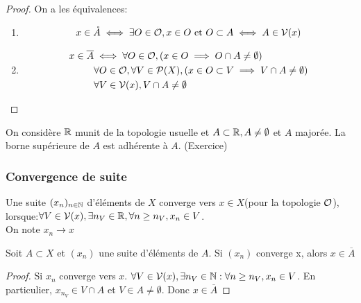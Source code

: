 \documentclass[]{report}
\begin{document}
    \begin{proof}{}{}
        On a les équivalences:
        \begin{enumerate}
            \item \[x\in\mathring{A}\iff\exists O\in\mathcal{O},x\in O\text{ et }O\subset A\iff A\in \mathcal{V}(x)\]
            \item \begin{align*}
                x\in \overline{A}&\iff \forall O\in\mathcal{O},(x\in O\implies O\cap A\neq \emptyset)\\
                &\forall O\in\mathcal{O},\forall V\in \mathcal{P}(X),(x\in O\subset V\implies V\cap A\neq \emptyset) \\
                &\forall V\in\mathcal{V}(x),V\cap A\neq \emptyset \\
            \end{align*}
        \end{enumerate}
    \end{proof}

    \begin{ex}{}{}
        On considère $\mathbb{R}$ munit de la topologie usuelle et $A\subset \mathbb{R},A\neq\emptyset$ et $A$ majorée. La borne supérieure de $A$ est adhérente à $A$. (Exercice)
    \end{ex}

    \subsubsection*{Convergence de suite}

    \begin{df}{}{}
        Une suite $(x_n)_{n\in\mathbb{N}}$ d'éléments de $X$ converge vers $x\in X$(pour la topologie $\mathcal{O}$), lorsque:$\forall V\in\mathcal{V}(x),\exists n_V\in\mathbb{R},\forall n\ge n_V,x_n\in V$.\\
        On note $x_n\longrightarrow x$
    \end{df}

    \begin{prop}{}{}
        Soit $A\subset X$ et $(x_n)$ une suite d'éléments de $A$. Si $(x_n)$ converge x, alors $x\in\overline{A}$
    \end{prop}

    \begin{proof}{}{}
        Si $x_n$ converge vers $x$. $\forall V\in \mathcal{V}(x),\exists n_V\in\mathbb{N}:\forall n\ge n_V,x_n\in V$. En particulier, $x_{n_V}\in V\cap A$ et $V\in A\neq \emptyset$. Donc $x\in\overline{A}$
    \end{proof}
\end{document}
